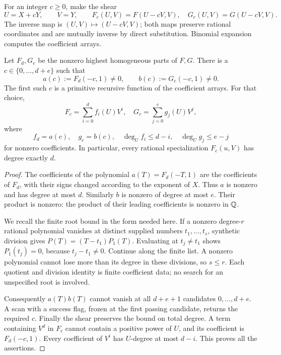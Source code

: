 For an integer \(c\ge0\), make the shear
\[
 U=X+cY,\qquad V=Y,\qquad
 F_c(U,V)=F(U-cV,V),\quad G_c(U,V)=G(U-cV,V).
 \tag{E1}\label{eq:elim-shear}
\]
The inverse map is \((U,V)\mapsto(U-cV,V)\); both maps preserve rational
coordinates and are mutually inverse by direct substitution.  Binomial
expansion computes the coefficient arrays.

\begin{lemma}\label{lem:elim-shear}
Let \(F_d,G_e\) be the nonzero highest homogeneous parts of \(F,G\).
There is a \(c\in\{0,\ldots,d+e\}\) such that
\[
 a(c):=F_d(-c,1)\ne0,\qquad b(c):=G_e(-c,1)\ne0.
 \tag{E2}\label{eq:elim-leading}
\]
The first such \(c\) is a primitive recursive function of the coefficient
arrays.  For that choice,
\[
 F_c=\sum_{i=0}^d f_i(U)V^i,\quad
 G_c=\sum_{j=0}^e g_j(U)V^j,
\]
where
\[
 f_d=a(c),\quad g_e=b(c),\quad
 \deg_U f_i\le d-i,\quad \deg_U g_j\le e-j
 \tag{E3}\label{eq:elim-degree-rows}
\]
for nonzero coefficients.  In particular, every rational specialization
\(F_c(u,V)\) has degree exactly \(d\).
\end{lemma}

\begin{proof}
The coefficients of the polynomial \(a(T)=F_d(-T,1)\) are the coefficients
of \(F_d\), with their signs changed according to the exponent of \(X\).
Thus \(a\) is nonzero and has degree at most \(d\).  Similarly \(b\) is
nonzero of degree at most \(e\).  Their product is nonzero: the product of
their leading coefficients is nonzero in \(\mathbb Q\).

We recall the finite root bound in the form needed here.  If a nonzero
degree-\(r\) rational polynomial vanishes at distinct supplied numbers
\(t_1,\ldots,t_s\), synthetic division gives
\(P(T)=(T-t_1)P_1(T)\).  Evaluating at \(t_j\ne t_1\) shows
\(P_1(t_j)=0\), because \(t_j-t_1\ne0\).  Continue along the finite
list.  A nonzero polynomial cannot lose more than its degree in these
divisions, so \(s\le r\).  Each quotient and division identity is finite
coefficient data; no search for an unspecified root is involved.

Consequently \(a(T)b(T)\) cannot vanish at all \(d+e+1\) candidates
\(0,\ldots,d+e\).  A scan with a success flag, frozen at the first passing
candidate, returns the required \(c\).  Finally the shear preserves the
bound on total degree.  A term containing \(V^d\) in \(F_c\) cannot
contain a positive power of \(U\), and its coefficient is
\(F_d(-c,1)\).  Every coefficient of \(V^i\) has \(U\)-degree at most
\(d-i\).  This proves all the assertions.
\end{proof}

